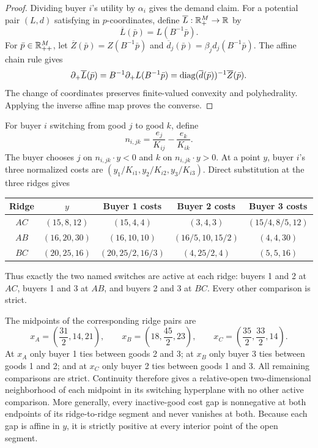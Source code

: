 \begin{proof}
Dividing buyer $i$'s utility by $\alpha_i$ gives the demand claim. For a potential pair $(L,d)$ satisfying  in $p$-coordinates, define $\overline L:\mathbb{R}_+^M\to\mathbb{R}$ by
\[
\overline L(\bar p)=L(B^{-1}\bar p).
\]
For $\bar p\in\mathbb{R}_{++}^M$, let $\overline Z(\bar p)=Z(B^{-1}\bar p)$ and $\overline d_j(\bar p)=\beta_jd_j(B^{-1}\bar p)$. The affine chain rule gives
\[
\partial_+\overline L(\bar p)
=B^{-1}\partial_+ L(B^{-1}\bar p)
=\operatorname{diag}(\overline d(\bar p))^{-1}\overline Z(\bar p).
\]
The change of coordinates preserves finite-valued convexity and polyhedrality. Applying the inverse affine map proves the converse.
\end{proof}

For buyer $i$ switching from good $j$ to good $k$, define
\begin{equation}\label{eq:facet-normal-general}
n_{i,jk}=\frac{e_j}{K_{ij}}-\frac{e_k}{K_{ik}}.
\end{equation}
The buyer chooses $j$ on $n_{i,jk}\cdot y<0$ and $k$ on $n_{i,jk}\cdot y>0$. At a point $y$, buyer $i$'s three normalized costs are $(y_1/K_{i1},y_2/K_{i2},y_3/K_{i3})$. Direct substitution at the three ridges gives
\begin{center}
\scriptsize
\begin{tabular}{@{}ccccc@{}}
\toprule
Ridge & $y$ & Buyer 1 costs & Buyer 2 costs & Buyer 3 costs\\
\midrule
$AC$ & $(15,8,12)$ & $(15,4,4)$ & $(3,4,3)$ & $(15/4,8/5,12)$\\
$AB$ & $(16,20,30)$ & $(16,10,10)$ & $(16/5,10,15/2)$ & $(4,4,30)$\\
$BC$ & $(20,25,16)$ & $(20,25/2,16/3)$ & $(4,25/2,4)$ & $(5,5,16)$\\
\bottomrule
\end{tabular}
\end{center}
Thus exactly the two named switches are active at each ridge: buyers 1 and 2 at $AC$, buyers 1 and 3 at $AB$, and buyers 2 and 3 at $BC$. Every other comparison is strict.

The midpoints of the corresponding ridge pairs are
\[
x_A=\left(\frac{31}{2},14,21\right),\qquad
x_B=\left(18,\frac{45}{2},23\right),\qquad
x_C=\left(\frac{35}{2},\frac{33}{2},14\right).
\]
At $x_A$ only buyer 1 ties between goods 2 and 3; at $x_B$ only buyer 3 ties between goods 1 and 2; and at $x_C$ only buyer 2 ties between goods 1 and 3. All remaining comparisons are strict. Continuity therefore gives a relative-open two-dimensional neighborhood of each midpoint in its switching hyperplane with no other active comparison. More generally, every inactive-good cost gap is nonnegative at both endpoints of its ridge-to-ridge segment and never vanishes at both. Because each gap is affine in $y$, it is strictly positive at every interior point of the open segment.

